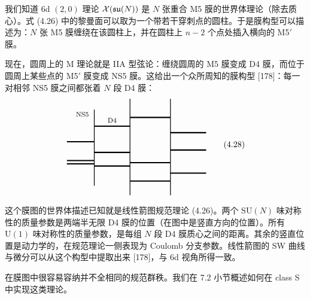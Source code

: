 
 我们知道 6d $(2,0)$ 理论 $\mathcal{X}(\mathfrak{su}(N))$ 是 $N$ 张重合 M5 膜的世界体理论（除去质心）。式 (4.26) 中的黎曼面可以取为一个带若干穿刺点的圆柱。于是膜构型可以描述为：$N$ 张 M5 膜缠绕在该圆柱上，并在圆柱上 $n-2$ 个点处插入横向的 M5$'$ 膜。

现在，圆周上的 M 理论就是 IIA 型弦论：缠绕圆周的 M5 膜变成 D4 膜，而位于圆周上某些点的 M5$'$ 膜变成 NS5 膜。这给出一个众所周知的膜构型 [178]：每一对相邻 NS5 膜之间都张着 $N$ 段 D4 膜：
\begin{equation}
\begin{tikzpicture}[baseline=(current bounding box.center),line width=0.85pt]
  \draw (0,0.1) -- (0,3.3);
  \draw (1.5,-0.3) -- (1.5,3.75);
  \draw (3.2,-0.3) -- (3.2,3.75);
  \draw[line width=1.5pt] (-1.15,1.95) -- (0,1.95);
  \draw[line width=1.5pt] (-1.15,1.16) -- (0,1.16);
  \draw[line width=1.5pt] (-1.15,1.02) -- (0,1.02);
  \draw[line width=1.5pt] (0,2.6) -- (1.5,2.6);
  \draw[line width=1.5pt] (0,1.5) -- (1.5,1.5);
  \draw[line width=1.5pt] (0,0.93) -- (1.5,0.93);
  \draw[line width=1.5pt] (1.5,2.97) -- (3.2,2.97);
  \draw[line width=1.5pt] (1.5,1.07) -- (3.2,1.07);
  \draw[line width=1.5pt] (1.5,0.3) -- (3.2,0.3);
  \draw[line width=1.5pt] (3.2,2.33) -- (4.7,2.33);
  \draw[line width=1.5pt] (3.2,1.6) -- (4.7,1.6);
  \draw[line width=1.5pt] (3.2,0.63) -- (4.7,0.63);
  \node[font=\footnotesize] at (-0.5,3.1) {NS5};
  \node[font=\footnotesize] at (0.75,2.85) {D4};
\end{tikzpicture}
  \tag{4.28}
\end{equation}

这个膜图的世界体描述已知就是线性箭图规范理论 (4.26)。两个 $\mathrm{SU}(N)$ 味对称性的质量参数是两端半无限 D4 膜的位置（在图中是竖直方向的位置）。所有 $\mathrm{U}(1)$ 味对称性的质量参数，是每组 $N$ 段 D4 膜质心之间的距离。其余的竖直位置是动力学的，在规范理论一侧表现为 Coulomb 分支参数。线性箭图的 SW 曲线与微分可以从这个构型中提取出来 [178]，与 6d 视角所得一致。

在膜图中很容易容纳并不全相同的规范群秩。我们在 7.2 小节概述如何在 class S 中实现这类理论。


